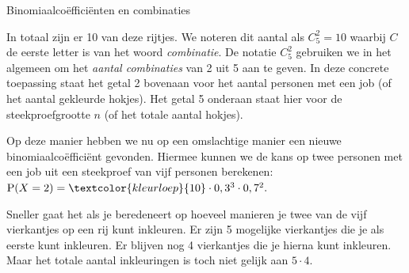 \begin{lesactiviteit}{Binomiaalcoëfficiënten en combinaties}
\begin{vraagenantwoord}[resume]

\end{vraagenantwoord}

In totaal zijn er 10 van deze rijtjes. We noteren dit aantal als $C^2_5=10$ waarbij $C$ de eerste letter is van het woord \emph{combinatie}. De notatie  $C^2_5$ gebruiken we in het algemeen om het \emph{aantal combinaties} van 2 uit 5 aan te geven. In deze concrete toepassing staat het getal 2 bovenaan voor het aantal personen met een job (of het aantal gekleurde hokjes). Het getal 5 onderaan staat hier voor de steekproefgrootte $n$ (of het totale aantal hokjes). 

Op deze manier hebben we nu op een omslachtige manier een nieuwe binomiaalcoëfficiënt gevonden. Hiermee kunnen we de kans op twee personen met een job uit een steekproef van vijf personen berekenen: $\textrm{P}(X=2)=\textcolor{kleurloep}{10} \cdot 0,3^3 \cdot 0,7^2.$


Sneller gaat het als je beredeneert op hoeveel manieren je twee van de vijf vierkantjes op een rij kunt inkleuren. Er zijn 5 mogelijke vierkantjes die je als eerste kunt inkleuren. Er blijven nog 4 vierkantjes die je hierna kunt inkleuren. Maar het totale aantal inkleuringen is toch niet gelijk aan $5 \cdot 4$. 


\end{lesactiviteit}
